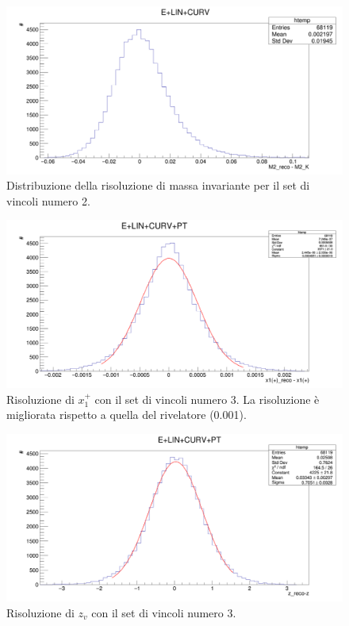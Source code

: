 \documentclass[8pt]{extarticle}
\begin{document}
\begin{figure}[h!]
	\begin{center}
		\includegraphics[scale=0.25]{set_2_inv} 
		\caption{Distribuzione della risoluzione di massa invariante per il set di vincoli numero 2.}
		\label{fig:set_2_inv}
	\end{center}
\end{figure}


\begin{figure}[h!]
	\begin{center}
		\includegraphics[scale=0.25]{set_3_x} 
		\caption{Risoluzione di $x_1^+$ con il set di vincoli numero 3. La risoluzione è migliorata rispetto a quella del rivelatore (0.001).}
		\label{fig:set_3_x}
	\end{center}
\end{figure}

\begin{figure}[h!]
	\begin{center}
		\includegraphics[scale=0.25]{set_3_z} 
		\caption{Risoluzione di $z_v$ con il set di vincoli numero 3.}
		\label{fig:set_3_z}
	\end{center}
\end{figure}
\end{document}
